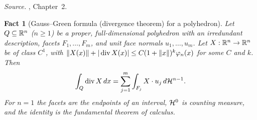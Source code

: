 \documentclass[11pt,letterpaper]{article}
\theoremstyle{plain}
\newtheorem{fact}{Fact}[section]
\begin{document}
\emph{Source.} , Chapter~2.

\begin{fact}[Gauss--Green formula (divergence theorem) for a polyhedron]\label{tb:divergence}
Let \(Q\subseteq\mathbb R^n\) (\(n\ge1\)) be a proper, full-dimensional polyhedron
with an irredundant description, facets \(F_1,\ldots,F_m\), and unit
face normals \(u_1,\ldots,u_m\). Let \(X:\mathbb R^n\to\mathbb R^n\) be of class \(C^1\), with
\(\left\lVert X(x)\right\rVert+|\operatorname{div}X(x)|\le C(1+\left\lVert x\right\rVert)^k\varphi_n(x)\) for
some \(C\) and \(k\). Then
\[
 \int_Q\operatorname{div}X\,dx=\sum_{j=1}^m\int_{F_j}X\cdot u_j\,d\mathcal H^{n-1}.
\]
For \(n=1\) the facets are the endpoints of an interval, \(\mathcal H^0\) is
counting measure, and the identity is the fundamental theorem of calculus.
\end{fact}
\end{document}
